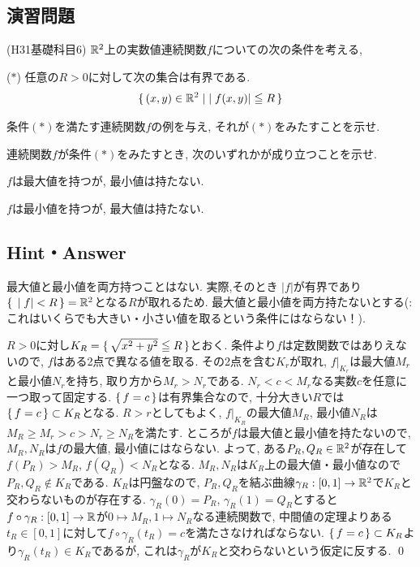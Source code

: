 \subsection{演習問題}

\begin{prob} (H31基礎科目6) \label{prob:H31kiso6}
$\mathbb{R}^2$上の実数値連続関数$f$についての次の条件を考える,
\begin{center}
    ($\ast$) 任意の$R>0$に対して次の集合は有界である.
    \[\set{(x,y)\in \mathbb{R}^2 \mid |f(x,y)| \leqq R}\]
\end{center}
\ben
\item 条件$(\ast)$を満たす連続関数$f$の例を与え, それが$(\ast)$をみたすことを示せ.
\item 連続関数$f$が条件$(\ast)$をみたすとき, 次のいずれかが成り立つことを示せ.
\ben
\item $f$は最大値を持つが, 最小値は持たない.
\item $f$は最小値を持つが, 最大値は持たない.

\een
\een
\end{prob}

\subsection{Hint・Answer}
{\small
\begin{probans}
最大値と最小値を両方持つことはない. 実際,そのとき $|f|$が有界であり$\set{|f| < R} = \mathbb{R}^2$となる$R$が取れるため. 最大値と最小値を両方持たないとする(: これはいくらでも大きい・小さい値を取るという条件にはならない！). \par
$R>0$に対し$K_R = \set{\sqrt{x^2+y^2}\leqq R}$とおく. 条件より$f$は定数関数ではありえないので, $f$はある2点で異なる値を取る. その2点を含む$K_r$が取れ, $f|_{K_r}$は最大値$M_r$と最小値$N_r$を持ち, 取り方から$M_r>N_r$である. $N_r< c< M_r$なる実数$c$を任意に一つ取って固定する. $\set{f=c}$は有界集合なので, 十分大きい$R$では$\set{f=c} \subset K_R$となる. $R>r$としてもよく, $f|_{K_R}$の最大値$M_R$, 最小値$N_R$は$M_R \geq M_r > c > N_r \geq N_{R}$を満たす. ところが$f$は最大値と最小値を持たないので, $M_R,N_R$は$f$の最大値,
最小値にはならない. よって, ある$P_{R},Q_{R}\in \mathbb{R}^2$が存在して$f(P_{R}) > M_R$, $f(Q_{R}) < N_R$となる. $M_R,N_R$は$K_R$上の最大値・最小値なので$P_R,Q_R\notin K_R$である. $K_R$は円盤なので, $P_R,Q_R$を結ぶ曲線$\gamma_{R}:[0,1]\to \mathbb{R}^2$で$K_R$と交わらないものが存在する. $\gamma_{R}(0) = P_R$, $\gamma_{R}(1) = Q_R$とすると $f\circ \gamma_{R}:[0,1]\to \mathbb{R}$が$0\mapsto M_R, 1\mapsto N_R$なる連続関数で, 中間値の定理よりある$t_R\in [0,1]$に対して$f\circ \gamma_R(t_R) = c$を満たさなければならない. $\set{f=c} \subset K_R$より$\gamma_R(t_R)\in K_R$であるが, これは$\gamma_R$が$K_R$と交わらないという仮定に反する. \qed
\end{probans}
}








\clearpage
